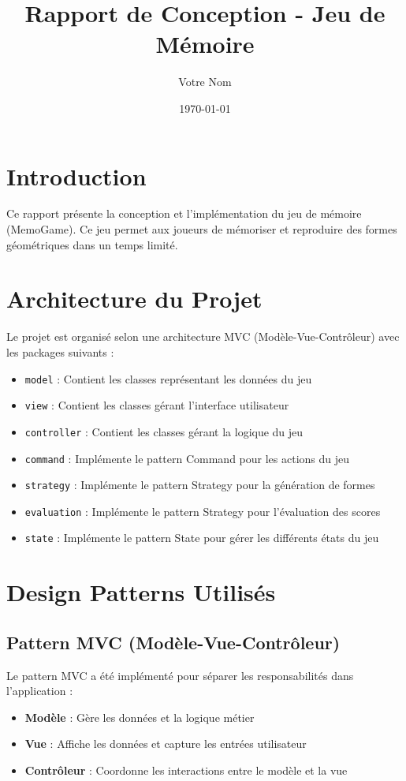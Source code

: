 \documentclass[11pt,a4paper]{article}
\title{Rapport de Conception - Jeu de Mémoire}
\author{Votre Nom}
\date{\today}
\begin{document}
\maketitle

\tableofcontents

\section{Introduction}
Ce rapport présente la conception et l'implémentation du jeu de mémoire (MemoGame). Ce jeu permet aux joueurs de mémoriser et reproduire des formes géométriques dans un temps limité.

\section{Architecture du Projet}
Le projet est organisé selon une architecture MVC (Modèle-Vue-Contrôleur) avec les packages suivants :
\begin{itemize}
    \item \texttt{model} : Contient les classes représentant les données du jeu
    \item \texttt{view} : Contient les classes gérant l'interface utilisateur
    \item \texttt{controller} : Contient les classes gérant la logique du jeu
    \item \texttt{command} : Implémente le pattern Command pour les actions du jeu
    \item \texttt{strategy} : Implémente le pattern Strategy pour la génération de formes
    \item \texttt{evaluation} : Implémente le pattern Strategy pour l'évaluation des scores
    \item \texttt{state} : Implémente le pattern State pour gérer les différents états du jeu
\end{itemize}

\section{Design Patterns Utilisés}

\subsection{Pattern MVC (Modèle-Vue-Contrôleur)}
Le pattern MVC a été implémenté pour séparer les responsabilités dans l'application :
\begin{itemize}
    \item \textbf{Modèle} : Gère les données et la logique métier
    \item \textbf{Vue} : Affiche les données et capture les entrées utilisateur
    \item \textbf{Contrôleur} : Coordonne les interactions entre le modèle et la vue
\end{itemize}
\end{document}
